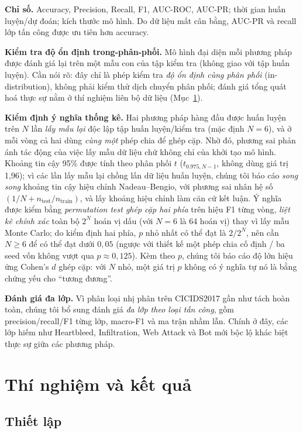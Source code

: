 \documentclass[conference]{IEEEtran}
\begin{document}
\textbf{Chỉ số.} Accuracy, Precision, Recall, F1, AUC-ROC, AUC-PR; thời gian huấn luyện/dự đoán; kích thước mô hình. Do dữ liệu mất cân bằng, AUC-PR và recall lớp tấn công được ưu tiên hơn accuracy.

\textbf{Kiểm tra độ ổn định trong-phân-phối.} Mô hình đại diện mỗi phương pháp được đánh giá lại trên một mẫu con của tập kiểm tra (không giao với tập huấn luyện). Cần nói rõ: đây chỉ là phép kiểm tra \emph{độ ổn định cùng phân phối} (in-distribution), không phải kiểm thử dịch chuyển phân phối; đánh giá tổng quát hoá thực sự nằm ở thí nghiệm liên bộ dữ liệu (Mục~\ref{sec:exp}).

\textbf{Kiểm định ý nghĩa thống kê.} Hai phương pháp hàng đầu được huấn luyện trên $N$ lần \emph{lấy mẫu lại} độc lập tập huấn luyện/kiểm tra (mặc định $N{=}6$), và ở mỗi vòng cả hai dùng \emph{cùng một} phép chia để ghép cặp. Nhờ đó, phương sai phản ánh tác động của việc lấy mẫu dữ liệu chứ không chỉ của khởi tạo mô hình. Khoảng tin cậy 95\% được tính theo phân phối $t$ ($t_{0.975,N-1}$, không dùng giá trị 1{,}96); vì các lần lấy mẫu lại chồng lấn dữ liệu huấn luyện, chúng tôi báo cáo \emph{song song} khoảng tin cậy hiệu chỉnh Nadeau--Bengio, với phương sai nhân hệ số $(1/N + n_{\text{test}}/n_{\text{train}})$, và lấy khoảng hiệu chỉnh làm căn cứ kết luận. Ý nghĩa được kiểm bằng \emph{permutation test ghép cặp hai phía} trên hiệu F1 từng vòng, \emph{liệt kê chính xác} toàn bộ $2^N$ hoán vị dấu (với $N{=}6$ là 64 hoán vị) thay vì lấy mẫu Monte Carlo; do kiểm định hai phía, $p$ nhỏ nhất có thể đạt là $2/2^N$, nên cần $N \geq 6$ để có thể đạt dưới $0{,}05$ (ngược với thiết kế một phép chia cố định / ba seed vốn không vượt qua $p \approx 0{,}125$). Kèm theo $p$, chúng tôi báo cáo độ lớn hiệu ứng Cohen's $d$ ghép cặp: với $N$ nhỏ, một giá trị $p$ không có ý nghĩa tự nó là bằng chứng yếu cho ``tương đương''.

\textbf{Đánh giá đa lớp.} Vì phân loại nhị phân trên CICIDS2017 gần như tách hoàn toàn, chúng tôi bổ sung đánh giá \emph{đa lớp theo loại tấn công}, gồm precision/recall/F1 từng lớp, macro-F1 và ma trận nhầm lẫn. Chính ở đây, các lớp hiếm như Heartbleed, Infiltration, Web Attack và Bot mới bộc lộ khác biệt thực sự giữa các phương pháp.

\section{Thí nghiệm và kết quả}
\label{sec:exp}

\subsection{Thiết lập}
\end{document}

